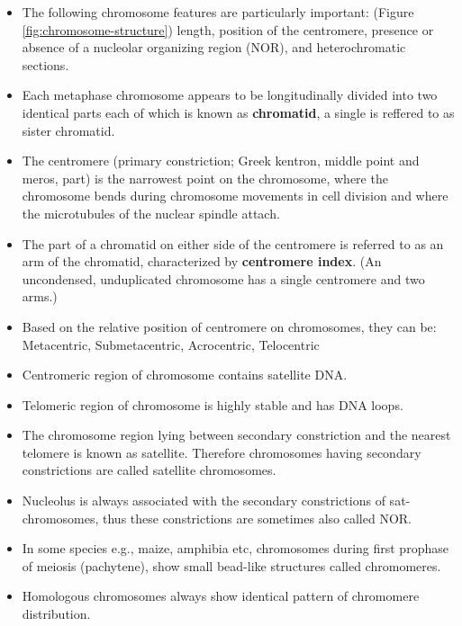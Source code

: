 \documentclass[11pt,dvipsnames,ignorenonframetext,aspectratio=169]{beamer}
\providecommand{\tightlist}{%
  \setlength{\itemsep}{0pt}\setlength{\parskip}{0pt}}
\begin{document}
\begin{frame}{}
\protect\hypertarget{section-2}{}
\begin{itemize}
\tightlist
\item
  The following chromosome features are particularly important: (Figure
  \ref{fig:chromosome-structure}) length, position of the centromere,
  presence or absence of a nucleolar organizing region (NOR), and
  heterochromatic sections.
\item
  Each metaphase chromosome appears to be longitudinally divided into
  two identical parts each of which is known as \textbf{chromatid}, a
  single is reffered to as sister chromatid.
\item
  The centromere (primary constriction; Greek kentron, middle point and
  meros, part) is the narrowest point on the chromosome, where the
  chromosome bends during chromosome movements in cell division and
  where the microtubules of the nuclear spindle attach.
\item
  The part of a chromatid on either side of the centromere is referred
  to as an arm of the chromatid, characterized by \textbf{centromere
  index}. (An uncondensed, unduplicated chromosome has a single
  centromere and two arms.)
\item
  Based on the relative position of centromere on chromosomes, they can
  be: Metacentric, Submetacentric, Acrocentric, Telocentric
\end{itemize}
\end{frame}

\begin{frame}{}
\protect\hypertarget{section-3}{}
\begin{itemize}
\tightlist
\item
  Centromeric region of chromosome contains satellite DNA.
\item
  Telomeric region of chromosome is highly stable and has DNA loops.
\item
  The chromosome region lying between secondary constriction and the
  nearest telomere is known as satellite. Therefore chromosomes having
  secondary constrictions are called satellite chromosomes.
\item
  Nucleolus is always associated with the secondary constrictions of
  sat-chromosomes, thus these constrictions are sometimes also called
  NOR.
\item
  In some species e.g., maize, amphibia etc, chromosomes during first
  prophase of meiosis (pachytene), show small bead-like structures
  called chromomeres.
\item
  Homologous chromosomes always show identical pattern of chromomere
  distribution.
\end{itemize}
\end{frame}
\end{document}
